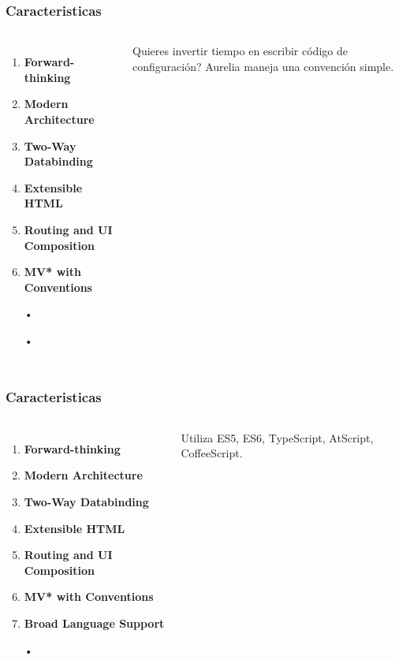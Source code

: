 \documentclass{beamer}
\begin{document}
\begin{frame}
\frametitle{Caracteristicas}
\begin{columns}[c]
\begin{enumerate}
\item \textbf{Forward-thinking}
\item \textbf{Modern Architecture}
\item \textbf{Two-Way Databinding}
\item \textbf{Extensible HTML}
\item \textbf{Routing and UI Composition}
\item \textbf{MV* with Conventions}
\item[•]
\item[•]
\end{enumerate}
Quieres invertir tiempo en escribir c\'odigo de configuraci\'on? Aurelia maneja una convenci\'on simple.
\end{columns}
\end{frame}
\begin{frame}
\frametitle{Caracteristicas}
\begin{columns}[c]
\begin{enumerate}
\item \textbf{Forward-thinking}
\item \textbf{Modern Architecture}
\item \textbf{Two-Way Databinding}
\item \textbf{Extensible HTML}
\item \textbf{Routing and UI Composition}
\item \textbf{MV* with Conventions}
\item \textbf{Broad Language Support}
\item[•]
\end{enumerate}
Utiliza ES5, ES6, TypeScript, AtScript, CoffeeScript.
\end{columns}
\end{frame}
\end{document}
